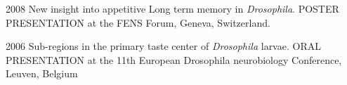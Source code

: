 \begin{itemize}
\begin{sloppypar}
%
%
%

%
%
%

\item[2008] New insight into appetitive Long term memory in \textit{Drosophila}.
POSTER PRESENTATION at the FENS Forum, Geneva, Switzerland.


\item[2006] Sub-regions in the primary taste center of \textit{Drosophila} larvae.
ORAL PRESENTATION at the 11th European Drosophila neurobiology Conference, Leuven, Belgium



%



\end{sloppypar}
\end{itemize}

